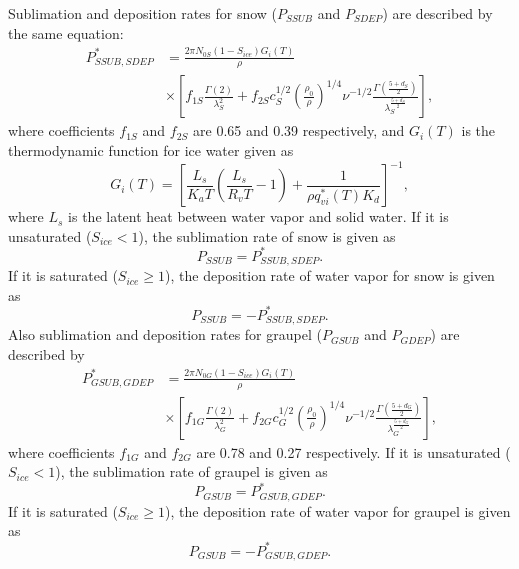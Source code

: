 Sublimation and deposition rates for snow ($P_{SSUB}$ and $P_{SDEP}$) are described by the same equation:
\begin{align}
  P^{*}_{SSUB,SDEP}&=\frac{2\pi N_{0S}(1-S_{ice})G_{i}(T)}{\rho} \nonumber \\
  &\times\left[f_{1S}\frac{\Gamma(2)}{\lambda^{2}_{S}}+f_{2S}c^{1/2}_{S}\left(\frac{\rho_{0}}{\rho}\right)^{1/4}\nu^{-1/2}\frac{\Gamma(\frac{5+d_{S}}{2})}{\lambda^{\frac{5+d_{S}}{2}}_{S}}\right],
\end{align}
where coefficients $f_{1S}$ and $f_{2S}$ are 0.65 and 0.39 respectively, and $G_{i}(T)$ is the thermodynamic function for ice water given as
\begin{equation}
  G_{i}(T)=\left[\frac{L_{s}}{K_{a}T}\left(\frac{L_{s}}{R_{v}T}-1\right)+\frac{1}{\rho q^{*}_{vi}(T)K_{d}}\right]^{-1},
\end{equation}
where $L_{s}$ is the latent heat between water vapor and solid water. If it is unsaturated ($S_{ice} < 1$), the sublimation rate of snow is given as
\begin{equation}
  P_{SSUB}=P^{*}_{SSUB,SDEP}.
\end{equation}
If it is saturated ($S_{ice} \geq 1$), the deposition rate of water vapor for snow is given as
\begin{equation}
  P_{SSUB}=-P^{*}_{SSUB,SDEP}.
\end{equation}
Also sublimation and deposition rates for graupel ($P_{GSUB}$ and $P_{GDEP}$) are described by
\begin{align}
  P^{*}_{GSUB,GDEP}&=\frac{2\pi N_{0G}(1-S_{ice})G_{i}(T)}{\rho} \nonumber \\
  &\times\left[f_{1G}\frac{\Gamma(2)}{\lambda^{2}_{G}}+f_{2G}c^{1/2}_{G}\left(\frac{\rho_{0}}{\rho}\right)^{1/4}\nu^{-1/2}\frac{\Gamma(\frac{5+d_{G}}{2})}{\lambda^{\frac{5+d_{G}}{2}}_{G}}\right],
\end{align}
where coefficients $f_{1G}$ and $f_{2G}$ are 0.78 and 0.27 respectively. If it is unsaturated ($S_{ice} < 1$), the sublimation rate of graupel is given as
\begin{equation}
  P_{GSUB}=P^{*}_{GSUB,GDEP}.
\end{equation}
If it is saturated ($S_{ice} \geq 1$), the deposition rate of water vapor for graupel is given as
\begin{equation}
  P_{GSUB}=-P^{*}_{GSUB,GDEP}.
\end{equation}

